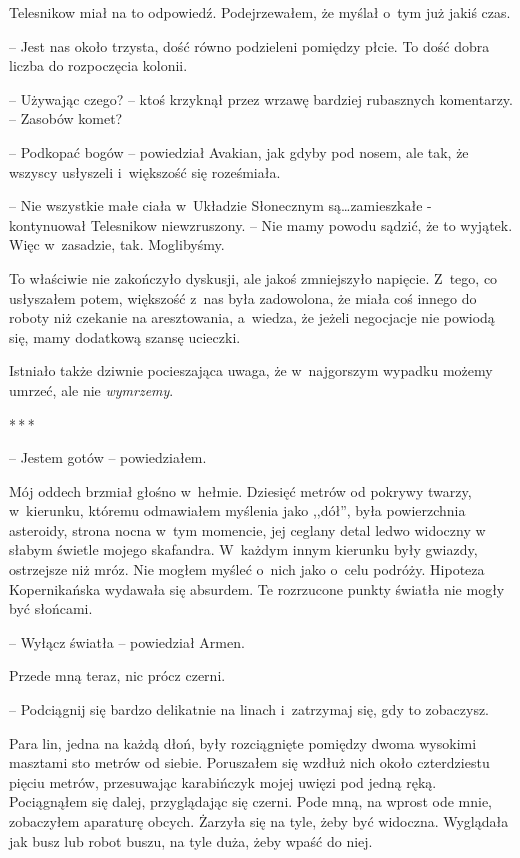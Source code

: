 \documentclass[oneside,polish,12pt,sfheadings]{mwbk}
\newcommand{\threeast}{\bigskip\par\centerline{*\,*\,*}\medskip\par}%
\begin{document}
Telesnikow miał na to odpowiedź. Podejrzewałem, że myślał o~tym już
jakiś czas.

-- Jest nas około trzysta, dość równo podzieleni pomiędzy płcie. To dość
dobra liczba do rozpoczęcia kolonii.

-- Używając czego? -- ktoś krzyknął przez wrzawę bardziej rubasznych
komentarzy. -- Zasobów komet?

-- Podkopać bogów -- powiedział Avakian, jak gdyby pod nosem, ale tak, że
wszyscy usłyszeli i~większość się roześmiała.

-- Nie wszystkie małe ciała w~Układzie Słonecznym są\ldots zamieszkałe -
kontynuował Telesnikow niewzruszony. -- Nie mamy powodu sądzić, że to
wyjątek. Więc w~zasadzie, tak. Moglibyśmy.

To właściwie nie zakończyło dyskusji, ale jakoś zmniejszyło napięcie. Z~tego, co usłyszałem potem, większość z~nas była zadowolona, że miała coś
innego do roboty niż czekanie na aresztowania, a~wiedza, że jeżeli
negocjacje nie powiodą się, mamy dodatkową szansę ucieczki.

Istniało także dziwnie pocieszająca uwaga, że w~najgorszym wypadku
możemy umrzeć, ale nie \emph{wymrzemy}.

\threeast

-- Jestem gotów -- powiedziałem.

Mój oddech brzmiał głośno w~hełmie. Dziesięć metrów od pokrywy twarzy, w~kierunku, któremu odmawiałem myślenia jako ,,dół'', była powierzchnia
asteroidy, strona nocna w~tym momencie, jej ceglany detal ledwo widoczny
w słabym świetle mojego skafandra. W~każdym innym kierunku były gwiazdy,
ostrzejsze niż mróz. Nie mogłem myśleć o~nich jako o~celu podróży.
Hipoteza Kopernikańska wydawała się absurdem. Te rozrzucone punkty
światła nie mogły być słońcami.

-- Wyłącz światła -- powiedział Armen.

Przede mną teraz, nic prócz czerni.

-- Podciągnij się bardzo delikatnie na linach i~zatrzymaj się, gdy to
zobaczysz.

Para lin, jedna na każdą dłoń, były rozciągnięte pomiędzy dwoma
wysokimi masztami sto metrów od siebie. Poruszałem się wzdłuż nich około
czterdziestu pięciu metrów, przesuwając karabińczyk mojej uwięzi pod
jedną ręką. Pociągnąłem się dalej, przyglądając się czerni. Pode mną, na
wprost ode mnie, zobaczyłem aparaturę obcych. Żarzyła się na tyle, żeby
być widoczna. Wyglądała jak busz lub robot buszu, na tyle duża, żeby
wpaść do niej.
\end{document}
